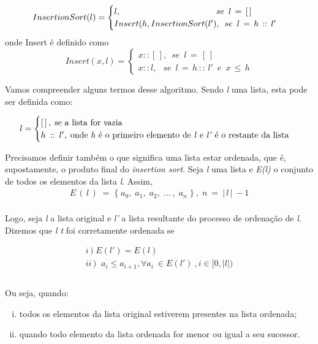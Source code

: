 \documentclass[a4paper, 10pt]{article}
\begin{document}
  \begin{equation}
  \label{eq:sort}
      InsertionSort(l) =
      \begin{cases}
          l, \hspace{11.2em}			 	      se \enspace l\,=\,[\,]\\
          Insert(h, InsertionSort(l'),\enspace se \enspace l\,=\,h\,::\,l'
      \end{cases}
  \end{equation}
  onde Insert é definido como
  \begin{equation}
  \label{eq:insert}
      Insert(x,l) =
      \begin{cases}
          x::[\,],\enspace se\enspace l\,=\,[\,] \\
          x::l,\: \enspace se\enspace l\,=\,h\,::\,l'\enspace e \enspace x\, \leq \, h
      \end{cases}
  \end{equation}

Vamos compreender alguns termos desse algoritmo. Sendo \textit{l} uma lista, esta pode ser definida como:

	\begin{equation*}
		l =
        \begin{cases}
        	[\,]\,,\; \text{se a lista for vazia}\\
            h\: :: \: l',\; \text{onde \textit{h} é o primeiro elemento de \textit{l} e \textit{l'} é o restante da lista} \\
        \end{cases}
	\end{equation*}

Precisamos definir também o que significa uma lista estar ordenada, que é, supostamente, o produto final do \textit{insertion sort}. Seja \textit{l}
uma lista e \textit{E(l)} o conjunto de todos os elementos da lista \textit{l}. Assim,
\begin{align*}
	E\,(\,l\,)\;=\; \{\;a_0,\;a_1,\;a_2,\;...\:,\;a_n\;\}\:,\;n\:=\:|\,l\,|\,-1
\end{align*}
\\
Logo, seja \textit{l} a lista original e \textit{l'} a lista resultante do processo de ordenação de \textit{l}. Dizemos que \textit{l t} foi corretamente ordenada se

\begin{gather*}
   i\,)\;E(l')=E(l) \\
   ii\,)\;\; a_i \leq a_{i+1}, \forall a_i \: \in E(l') \: , i\in [0,|l|) \\ 
\end{gather*}
\\
Ou seja, quando:
\begin{enumerate}[i)]
	\item todos os elementos da lista original estiverem presentes na lista ordenada;
    \item quando todo elemento da lista ordenada for menor ou igual a seu sucessor.
\end{enumerate}
\end{document}
